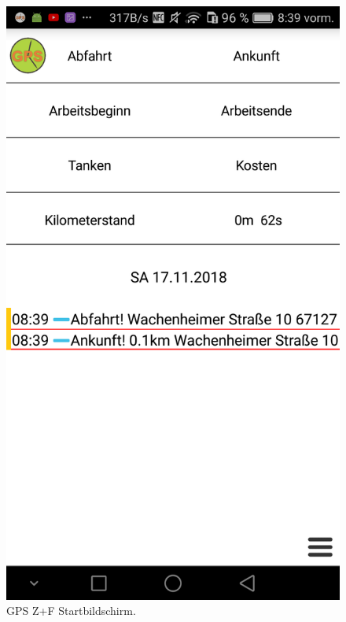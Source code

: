 \begin{figure}[H]%
    \begin{minipage}[b]{.4\linewidth} %
        \includegraphics[scale=0.14]{img/gps1}
        \caption{\label{img:img/gps1}GPS Z+F Startbildschirm.}
    \end{minipage}
    \hspace{0.1\linewidth}%
    \begin{minipage}[b]{.4\linewidth} %

\end{minipage}
\end{figure}

